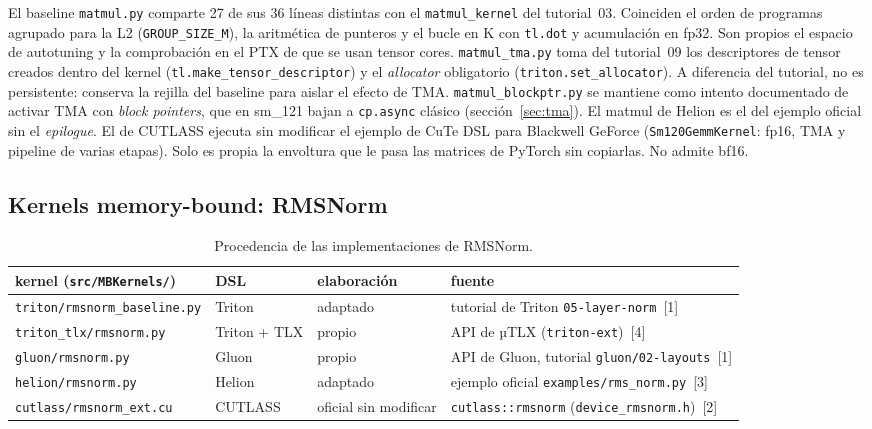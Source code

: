 El baseline \texttt{matmul.py} comparte 27 de sus 36 líneas distintas con el
\texttt{matmul\_kernel} del tutorial~03. Coinciden el orden de programas agrupado para la
L2 (\texttt{GROUP\_SIZE\_M}), la aritmética de punteros y el bucle en K con
\texttt{tl.dot} y acumulación en fp32. Son propios el espacio de autotuning y la
comprobación en el PTX de que se usan tensor cores. \texttt{matmul\_tma.py} toma del
tutorial~09 los descriptores de tensor creados dentro del kernel
(\texttt{tl.make\_tensor\_descriptor}) y el \emph{allocator} obligatorio
(\texttt{triton.set\_allocator}). A diferencia del tutorial, no es persistente: conserva
la rejilla del baseline para aislar el efecto de TMA. \texttt{matmul\_blockptr.py} se
mantiene como intento documentado de activar TMA con \emph{block pointers}, que en
sm\_121 bajan a \texttt{cp.async} clásico (sección~\ref{sec:tma}). El matmul de Helion
es el del ejemplo oficial sin el \emph{epilogue}. El de CUTLASS ejecuta sin modificar el
ejemplo de CuTe DSL para Blackwell GeForce (\texttt{Sm120GemmKernel}: fp16, TMA y pipeline de
varias etapas). Solo es propia la envoltura que le pasa las matrices de PyTorch sin copiarlas.
No admite bf16.

\subsection{Kernels memory-bound: RMSNorm}

\begin{table}[htbp]
  \centering\small
  \begin{tabularx}{\linewidth}{lllX}
    \toprule
    kernel (\texttt{src/MBKernels/}) & DSL & elaboración & fuente \\
    \midrule
    \texttt{triton/rmsnorm\_baseline.py} & Triton & adaptado & tutorial de Triton \texttt{05-layer-norm}~[1] \\
    \texttt{triton\_tlx/rmsnorm.py} & Triton + TLX & propio & API de µTLX (\texttt{triton-ext})~[4] \\
    \texttt{gluon/rmsnorm.py} & Gluon & propio & API de Gluon, tutorial \texttt{gluon/02-layouts}~[1] \\
    \texttt{helion/rmsnorm.py} & Helion & adaptado & ejemplo oficial \texttt{examples/rms\_norm.py}~[3] \\
    \texttt{cutlass/rmsnorm\_ext.cu} & CUTLASS & oficial sin modificar & \texttt{cutlass::rmsnorm} (\texttt{device\_rmsnorm.h})~[2] \\
    \bottomrule
  \end{tabularx}
  \caption{Procedencia de las implementaciones de RMSNorm.}
  \label{tab:procedencia-mb}
\end{table}

